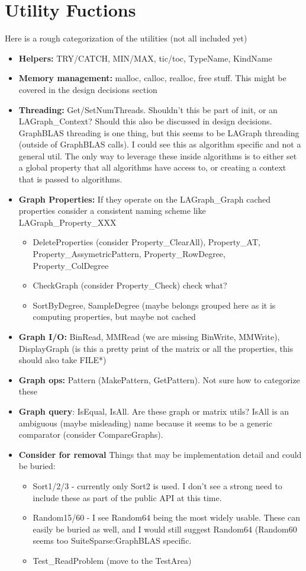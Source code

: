 \section{Utility Fuctions}
\label{sec:utility}

Here is a rough categorization of the utilities (not all included yet)
\begin{itemize}
\item {\bf Helpers:} TRY/CATCH, MIN/MAX, tic/toc, TypeName, KindName
\item {\bf Memory management:} malloc, calloc, realloc, free stuff.  This might be covered in the design decisions section
\item {\bf Threading:} Get/SetNumThreads. Shouldn’t this be part of init, or an LAGraph\_Context?  Should this also be discussed in design decisions.  GraphBLAS threading is one thing, but this seems to be LAGraph threading (outside of GraphBLAS calls).  I could see this as algorithm specific and not a general util.  The only way to leverage these inside algorithms is to either set a global property that all algorithms have access to, or creating a context that is passed to algorithms.
\item {\bf Graph Properties:} If they operate on the LAGraph\_Graph cached properties consider a consistent naming scheme like LAGraph\_Property\_XXX
\begin{itemize}
  \item DeleteProperties (consider Property\_ClearAll), Property\_AT, Property\_AssymetricPattern, Property\_RowDegree, Property\_ColDegree
  \item CheckGraph (consider Property\_Check)  check what?
  \item SortByDegree, SampleDegree  (maybe belongs grouped here as it is computing properties, but maybe not cached
\end{itemize}
\item {\bf Graph I/O:} BinRead, MMRead (we are missing BinWrite, MMWrite), DisplayGraph (is this a pretty print of the matrix or all the properties, this should also take FILE*)
\item {\bf Graph ops:} Pattern (MakePattern, GetPattern).  Not sure how to categorize these
\item {\bf Graph query}: IsEqual, IsAll. Are these graph or matrix utils? IsAll is an ambiguous (maybe misleading) name because it seems to be a generic comparator (consider CompareGraphs).
\item {\bf Consider for removal} Things that may be implementation detail and could be buried:
\begin{itemize}
  \item Sort1/2/3 - currently only Sort2 is used.  I don't see a strong need to include these as part of the public API at this time.
  \item Random15/60 - I see Random64 being the most widely usable. These can easily be buried as well, and I would still suggest Random64 (Random60 seems too SuiteSparse:GraphBLAS specific.
  \item Test\_ReadProblem (move to the TestArea)
\end{itemize}
\end{itemize}

